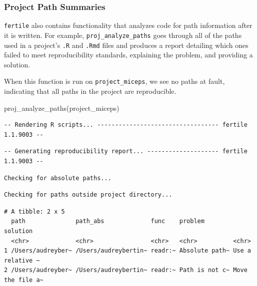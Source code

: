 \documentclass[12pt,twoside]{reedthesis}
\newenvironment{Shaded}{\begin{snugshade}}{\end{snugshade}}
\newcommand{\FunctionTok}[1]{\textcolor[rgb]{0.00,0.00,0.00}{#1}}
\newcommand{\NormalTok}[1]{#1}
\newcommand{\StringTok}[1]{\textcolor[rgb]{0.31,0.60,0.02}{#1}}
\begin{document}
\hypertarget{project-path-summaries}{%
\subsubsection{Project Path Summaries}\label{project-path-summaries}}

\texttt{fertile} also contains functionality that analyzes code for path information after it is written. For example, \texttt{proj\_analyze\_paths} goes through all of the paths used in a project's \texttt{.R} and \texttt{.Rmd} files and produces a report detailing which ones failed to meet reproducibility standards, explaining the problem, and providing a solution.

When this function is run on \texttt{project\_miceps}, we see no paths at fault, indicating that all paths in the project are reproducible.
\begin{Shaded}
\begin{Highlighting}[]
\FunctionTok{proj\_analyze\_paths}\NormalTok{(}\StringTok{\textquotesingle{}project\_miceps\textquotesingle{}}\NormalTok{)}
\end{Highlighting}
\end{Shaded}
\footnotesize
\begin{verbatim}
-- Rendering R scripts... ---------------------------------- fertile 1.1.9003 --
\end{verbatim}
\begin{verbatim}
-- Generating reproducibility report... -------------------- fertile 1.1.9003 --
\end{verbatim}
\begin{verbatim}
Checking for absolute paths...
\end{verbatim}
\begin{verbatim}
Checking for paths outside project directory...
\end{verbatim}
\begin{verbatim}
# A tibble: 2 x 5
  path              path_abs             func    problem        solution        
  <chr>             <chr>                <chr>   <chr>          <chr>           
1 /Users/audreyber~ /Users/audreybertin~ readr:~ Absolute path~ Use a relative ~
2 /Users/audreyber~ /Users/audreybertin~ readr:~ Path is not c~ Move the file a~
\end{verbatim}
\normalsize
\end{document}
